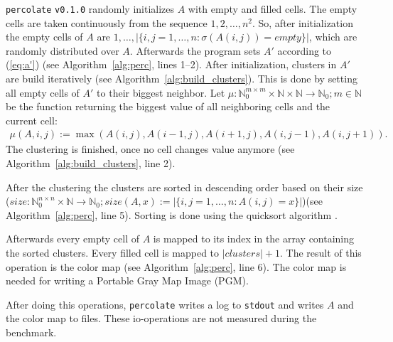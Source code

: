 \documentclass[twoside,11pt]{article}
\def\perc{\texttt{perco\-late}}
\def\v{\texttt{v0.1.0}}
\begin{document}
\perc{} \v{} randomly initializes $A$ with empty and
filled cells.
The empty cells are taken continuously from the sequence
$1,2,\dots,n^2$.
So, after initialization the empty cells of $A$ are
$1,\dots,|\{i,j=1,\dots,n:\sigma(A(i,j))=empty\}|$, which
are randomly distributed over $A$.
Afterwards the program sets $A'$ according to (\ref{eq:a'})
(see Algorithm~\ref{alg:perc}, lines 1--2).
After initialization, clusters in $A'$ are build
iteratively (see Algorithm~\ref{alg:build_clusters}).
This is done by setting all empty cells of $A'$ to their
biggest neighbor.
Let $\mu:\mathbb{N}_0^{m \times m} \times \mathbb{N} \times
\mathbb{N} \rightarrow \mathbb{N}_0; m \in \mathbb{N}$ be
the function returning the biggest value of all neighboring
cells and the current cell:
\begin{align*}
  \mu(A, i, j) := \max(A(i, j), A(i-1, j), A(i+1, j),
                       A(i, j-1), A(i, j+1)).
\end{align*}
The clustering is finished, once no cell changes value
anymore (see Algorithm~\ref{alg:build_clusters}, line 2).

After the clustering the clusters are sorted in descending
order based on their size
($size: \mathbb{N}_0^{n \times n} \times \mathbb{N}
\rightarrow \mathbb{N}_0; size(A, x) :=
|\{i,j=1,\dots,n: A(i,j) = x\}|$)(see
Algorithm~\ref{alg:perc}, line 5).
Sorting is done using the quicksort algorithm
\citep[see][]{hoare_1961}.

Afterwards every empty cell of $A$ is mapped to its index
in the array containing the sorted clusters.
Every filled cell is mapped to $|clusters| + 1$.
The result of this operation is the color map (see
Algorithm~\ref{alg:perc}, line 6).
The color map is needed for writing a Portable Gray Map
Image (PGM).

After doing this operations, \perc{} writes a log to
\texttt{stdout} and writes $A$ and the color map to files.
These io-operations are not measured during the benchmark.

\begin{algorithm}
  \caption{: \perc{}}
  \label{alg:perc}

  \begin{algorithmic}[1]
  \end{algorithmic}
\end{algorithm}
\end{document}
